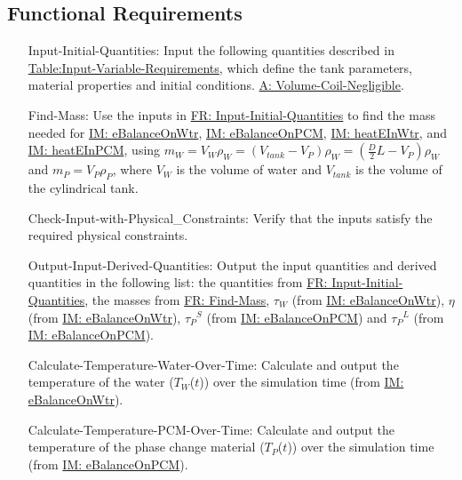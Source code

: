 \documentclass[12pt]{article}
\begin{document}
\subsection{Functional Requirements}
\label{Sec:FRs}
\begin{itemize}
\item[Input-Initial-Quantities:\phantomsection\label{inputInitQuants}]Input the following quantities described in \hyperref[Table:Input-Variable-Requirements]{Table:Input-Variable-Requirements}, which define the tank parameters, material properties and initial conditions. \hyperref[A:Volume-Coil-Negligible]{A: Volume-Coil-Negligible}.
\item[Find-Mass:\phantomsection\label{findMass}]Use the inputs in \hyperref[inputInitQuants]{FR: Input-Initial-Quantities} to find the mass needed for \hyperref[IM:eBalanceOnWtr]{IM: eBalanceOnWtr}, \hyperref[IM:eBalanceOnPCM]{IM: eBalanceOnPCM}, \hyperref[IM:heatEInWtr]{IM: heatEInWtr}, and \hyperref[IM:heatEInPCM]{IM: heatEInPCM}, using ${m_{W}}={V_{W}} {ρ_{W}}=\left({V_{tank}}-{V_{P}}\right) {ρ_{W}}=\left(\frac{D}{2} L-{V_{P}}\right) {ρ_{W}}$ and ${m_{P}}={V_{P}} {ρ_{P}}$, where ${V_{W}}$ is the volume of water and ${V_{tank}}$ is the volume of the cylindrical tank.
\item[Check-Input-with-Physical\_Constraints:\phantomsection\label{checkWithPhysConsts}]Verify that the inputs satisfy the required physical constraints.
\item[Output-Input-Derived-Quantities:\phantomsection\label{outputInputDerivQuants}]Output the input quantities and derived quantities in the following list: the quantities from \hyperref[inputInitQuants]{FR: Input-Initial-Quantities}, the masses from \hyperref[findMass]{FR: Find-Mass}, ${τ_{W}}$ (from \hyperref[IM:eBalanceOnWtr]{IM: eBalanceOnWtr}), $η$ (from \hyperref[IM:eBalanceOnWtr]{IM: eBalanceOnWtr}), ${{τ_{P}}^{S}}$ (from \hyperref[IM:eBalanceOnPCM]{IM: eBalanceOnPCM}) and ${{τ_{P}}^{L}}$ (from \hyperref[IM:eBalanceOnPCM]{IM: eBalanceOnPCM}).
\item[Calculate-Temperature-Water-Over-Time:\phantomsection\label{calcTempWtrOverTime}]Calculate and output the temperature of the water (${T_{W}}$($t$)) over the simulation time (from \hyperref[IM:eBalanceOnWtr]{IM: eBalanceOnWtr}).
\item[Calculate-Temperature-PCM-Over-Time:\phantomsection\label{calcTempPCMOverTime}]Calculate and output the temperature of the phase change material (${T_{P}}$($t$)) over the simulation time (from \hyperref[IM:eBalanceOnPCM]{IM: eBalanceOnPCM}).

\end{itemize}
\end{document}
